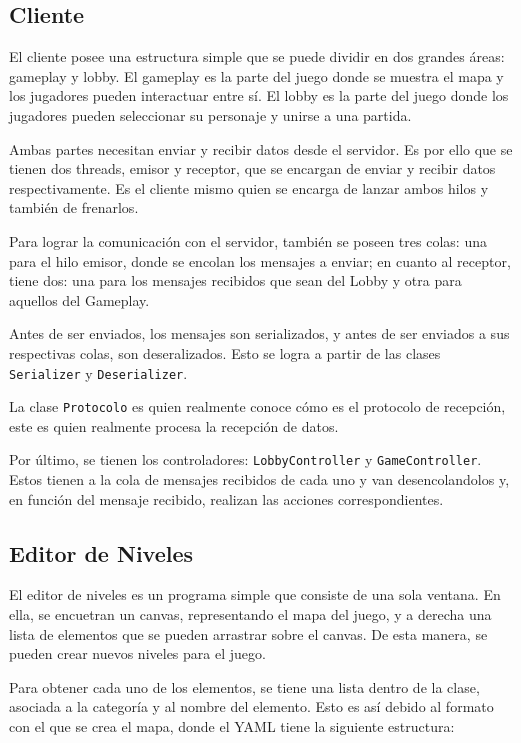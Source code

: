 \documentclass[titlepage,a4paper]{article}
\begin{document}
\subsection{Cliente}
El cliente posee una estructura simple que se puede dividir en dos grandes áreas: gameplay y lobby. El gameplay es la parte del juego donde se muestra el mapa y los jugadores pueden interactuar entre sí. El lobby es la parte del juego donde los jugadores pueden seleccionar su personaje y unirse a una partida.

Ambas partes necesitan enviar y recibir datos desde el servidor. Es por ello que se tienen dos threads, emisor y receptor, que se encargan de enviar y recibir datos respectivamente. Es el cliente mismo quien se encarga de lanzar ambos hilos y también de frenarlos.

Para lograr la comunicación con el servidor, también se poseen tres colas: una para el hilo emisor, donde se encolan los mensajes a enviar; en cuanto al receptor, tiene dos: una para los mensajes recibidos que sean del Lobby y otra para aquellos del Gameplay. 

Antes de ser enviados, los mensajes son serializados, y antes de ser enviados a sus respectivas colas, son deseralizados. Esto se logra a partir de las clases \texttt{Serializer} y \texttt{Deserializer}.

La clase \texttt{Protocolo} es quien realmente conoce cómo es el protocolo de recepción, este es quien realmente procesa la recepción de datos. 

Por último, se tienen los controladores: \texttt{LobbyController} y \texttt{GameController}. Estos tienen a la cola de mensajes recibidos de cada uno y van desencolandolos y, en función del mensaje recibido, realizan las acciones correspondientes.

\subsection{Editor de Niveles}
El editor de niveles es un programa simple que consiste de una sola ventana. En ella, se encuetran un canvas, representando el mapa del juego, y a derecha una lista de elementos que se pueden arrastrar sobre el canvas. De esta manera, se pueden crear nuevos niveles para el juego.

Para obtener cada uno de los elementos, se tiene una lista dentro de la clase, asociada a la categoría y al nombre del elemento. Esto es así debido al formato con el que se crea el mapa, donde el YAML tiene la siguiente estructura:
\end{document}
